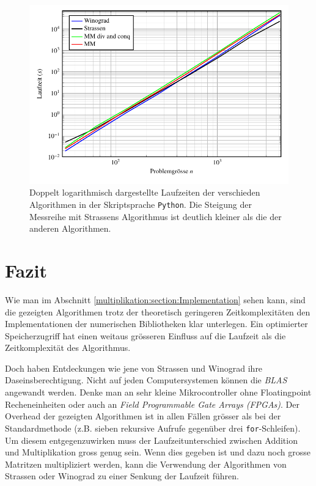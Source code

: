 \begin{figure}
	\center
	\includegraphics[width=\linewidth]{papers/multiplikation/images/meas_python}
	\caption{Doppelt logarithmisch dargestellte Laufzeiten der verschieden Algorithmen in der Skriptsprache \texttt{Python}.
	Die Steigung der Messreihe mit Strassens Algorithmus ist deutlich kleiner als die der anderen Algorithmen.
}
	\label{multiplikation:fig:python}
\end{figure}

\section{Fazit}

Wie man im Abschnitt \ref{multiplikation:section:Implementation} sehen kann, sind die gezeigten Algorithmen trotz der theoretisch geringeren Zeitkomplexitäten den Implementationen der numerischen Bibliotheken klar unterlegen.
Ein optimierter Speicherzugriff hat einen weitaus grösseren Einfluss auf die Laufzeit als die Zeitkomplexität des Algorithmus.

Doch haben Entdeckungen wie jene von Strassen und Winograd ihre Daseinsberechtigung.
Nicht auf jeden Computersystemen können die \textit{BLAS} angewandt werden.
Denke man an sehr kleine Mikrocontroller ohne Floatingpoint Recheneinheiten oder auch an \textit{Field Programmable Gate Arrays (FPGAs)}.
Der Overhead der gezeigten Algorithmen ist in allen Fällen grösser als bei der Standardmethode (z.B. sieben rekursive Aufrufe gegenüber drei \texttt{for}-Schleifen).
Um diesem entgegenzuwirken muss der Laufzeitunterschied zwischen Addition und Multiplikation gross genug sein.
Wenn dies gegeben ist und dazu noch grosse Matritzen multipliziert werden, kann die Verwendung der Algorithmen von Strassen oder Winograd zu einer Senkung der Laufzeit führen.


